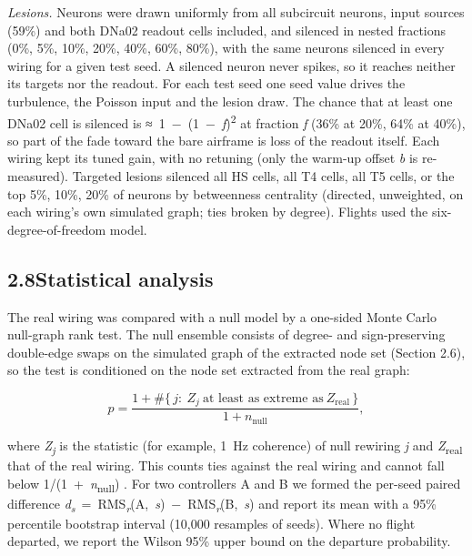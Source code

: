 \documentclass[11pt,letterpaper]{article}
\begin{document}
\emph{Lesions.} Neurons were drawn uniformly from all subcircuit
neurons, input sources (59\%) and both DNa02 readout cells included, and
silenced in nested fractions (0\%, 5\%, 10\%, 20\%, 40\%, 60\%, 80\%),
with the same neurons silenced in every wiring for a given test seed. A
silenced neuron never spikes, so it reaches neither its targets nor the
readout. For each test seed one seed value drives the turbulence, the
Poisson input and the lesion draw. The chance that at least one DNa02
cell is silenced is ≈~1~−~(1~−~\emph{f})\textsuperscript{2} at fraction
\emph{f} (36\% at 20\%, 64\% at 40\%), so part of the fade toward the
bare airframe is loss of the readout itself. Each wiring kept its tuned
gain, with no retuning (only the warm-up offset \emph{b} is
re-measured). Targeted lesions silenced all HS cells, all T4 cells, all
T5 cells, or the top 5\%, 10\%, 20\% of neurons by betweenness
centrality (directed, unweighted, on each wiring's own simulated graph;
ties broken by degree). Flights used the six-degree-of-freedom model.

\subsection{\texorpdfstring{2.8\quad Statistical
analysis}{2.8Statistical analysis}}\label{statistical-analysis}

\noindent The real wiring was compared with a null model by a one-sided
Monte Carlo null-graph rank test. The null ensemble consists of degree-
and sign-preserving double-edge swaps on the simulated graph of the
extracted node set (Section 2.6), so the test is conditioned on the node
set extracted from the real graph:

\[p=\frac{1+\#\{\,j:\ Z_j\ \text{at least as extreme as}\ Z_{\mathrm{real}}\,\}}{1+n_{\mathrm{null}}},\tag{15}\]

\noindent where \emph{Z\textsubscript{j}} is the statistic (for example,
1~Hz coherence) of null rewiring \emph{j} and
\emph{Z}\textsubscript{real} that of the real wiring. This counts ties
against the real wiring and cannot fall below
1/(1~+~\emph{n}\textsubscript{null}) \cite{phipson2010}. For two
controllers A and B we formed the per-seed paired difference
\emph{d\textsubscript{s}}~=~RMS\textsubscript{\emph{r}}(A,~\emph{s})~−~RMS\textsubscript{\emph{r}}(B,~\emph{s})
and report its mean with a 95\% percentile bootstrap interval (10,000
resamples of seeds). Where no flight departed, we report the Wilson 95\%
upper bound on the departure probability.
\end{document}
